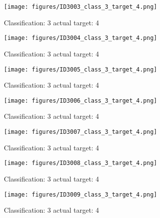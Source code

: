 \begin{figure}[h!]
\begin{center}
\texttt{[image: figures/ID3003\_class\_3\_target\_4.png]}
\end{center}
\caption{ Classification: 3 actual target: 4}
\label{fig:ID3003_class_3_target_4}
\end{figure}
\begin{figure}[h!]
\begin{center}
\texttt{[image: figures/ID3004\_class\_3\_target\_4.png]}
\end{center}
\caption{ Classification: 3 actual target: 4}
\label{fig:ID3004_class_3_target_4}
\end{figure}
\begin{figure}[h!]
\begin{center}
\texttt{[image: figures/ID3005\_class\_3\_target\_4.png]}
\end{center}
\caption{ Classification: 3 actual target: 4}
\label{fig:ID3005_class_3_target_4}
\end{figure}
\begin{figure}[h!]
\begin{center}
\texttt{[image: figures/ID3006\_class\_3\_target\_4.png]}
\end{center}
\caption{ Classification: 3 actual target: 4}
\label{fig:ID3006_class_3_target_4}
\end{figure}
\begin{figure}[h!]
\begin{center}
\texttt{[image: figures/ID3007\_class\_3\_target\_4.png]}
\end{center}
\caption{ Classification: 3 actual target: 4}
\label{fig:ID3007_class_3_target_4}
\end{figure}
\begin{figure}[h!]
\begin{center}
\texttt{[image: figures/ID3008\_class\_3\_target\_4.png]}
\end{center}
\caption{ Classification: 3 actual target: 4}
\label{fig:ID3008_class_3_target_4}
\end{figure}
\begin{figure}[h!]
\begin{center}
\texttt{[image: figures/ID3009\_class\_3\_target\_4.png]}
\end{center}
\caption{ Classification: 3 actual target: 4}
\label{fig:ID3009_class_3_target_4}
\end{figure}
